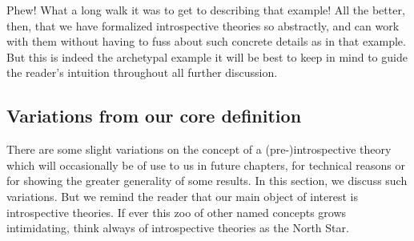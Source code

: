 Phew! What a long walk it was to get to describing that example! All the better, then, that we have formalized introspective theories so abstractly, and can work with them without having to fuss about such concrete details as in that example. But this is indeed the archetypal example it will be best to keep in mind to guide the reader's intuition throughout all further discussion.

\subsection{Variations from our core definition}
There are some slight variations on the concept of a (pre-)introspective theory which will occasionally be of use to us in future chapters, for technical reasons or for showing the greater generality of some results. In this section, we discuss such variations. But we remind the reader that our main object of interest is introspective theories. If ever this zoo of other named concepts grows intimidating, think always of introspective theories as the North Star.

